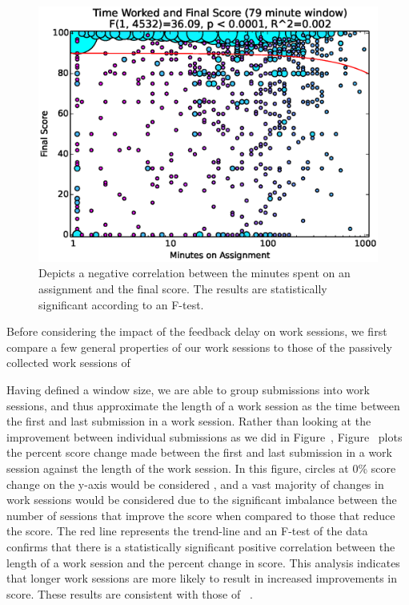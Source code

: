 \begin{figure}[!t]
\centering \includegraphics[width=5.25in]{graphs/Time_Worked_and_Final_Score_(79_minute_window).eps}
\caption{Depicts a negative correlation between the minutes spent on an
  assignment and the final score. The results are statistically significant
  according to an F-test.}
\end{figure}

Before considering the impact of the feedback delay on work sessions, we first
compare a few general properties of our work sessions to those of the passively
collected work sessions of \spacco[.]{}

Having defined a window size, we are able to group submissions into work
sessions, and thus approximate the length of a work session as the time between
the first and last submission in a work session. Rather than looking at the
improvement between individual submissions as we did in
Figure~, Figure~
plots the percent score change made between the first and last submission in a
work session against the length of the work session. In this figure, circles at
0\% score change on the y-axis would be considered \noi{}, and a vast majority
of changes in work sessions would be considered \imp{} due to the significant
imbalance between the number of sessions that improve the score when compared
to those that reduce the score. The red line represents the trend-line and an
F-test of the data confirms that there is a statistically significant positive
correlation between the length of a work session and the percent change in
score. This analysis indicates that longer work sessions are more likely to
result in increased improvements in score. These results are consistent with
those of \spacco{}~\cite{Spacco:2013:TIP:2462476.2465594}.

